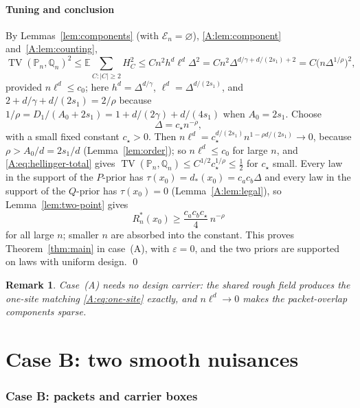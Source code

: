 \documentclass[11pt]{article}
\newtheorem{remark}[remark]{Remark}
\DeclareMathOperator{\TV}{TV}
\newcommand{\E}{\mathbb{E}}
\newcommand{\PP}{\mathbb{P}}
\newcommand{\abs}[1]{\lvert #1\rvert}
\begin{document}
\subsection{Tuning and conclusion}\label{A:sec:tuning}
By Lemmas~\ref{lem:components} (with \(\mathcal E_n=\varnothing\)),
\ref{A:lem:component} and~\ref{A:lem:counting},
\begin{equation}
 \TV(\PP_n,\mathbb Q_n)^2\le\E\sum_{C:\abs C\ge2}H^2_C\le Cn^2h^d\ell^d\Delta^2
 =Cn^2\Delta^{d/\gamma+d/(2s_1)+2}=C\bigl(n\Delta^{1/\rho}\bigr)^2,
 \label{A:eq:hellinger-total}
\end{equation}
provided \(n\ell^d\le c_0\); here \(h^d=\Delta^{d/\gamma}\), \(\ell^d=\Delta^{d/(2s_1)}\),
and \(2+d/\gamma+d/(2s_1)=2/\rho\) because \(1/\rho=D_1/(A_0+2s_1)=1+d/(2\gamma)+d/(4s_1)\)
when \(A_0=2s_1\).  Choose
\begin{equation}
 \Delta=c_{\star}n^{-\rho},
 \label{A:eq:tuning}
\end{equation}
with a small fixed constant \(c_{\star}>0\).  Then
\(n\ell^d=c_{\star}^{d/(2s_1)}n^{1-\rho d/(2s_1)}\to0\), because
\(\rho>A_0/d=2s_1/d\) (Lemma~\ref{lem:order}); so \(n\ell^d\le c_0\) for large
\(n\), and \eqref{A:eq:hellinger-total} gives
\(\TV(\PP_n,\mathbb Q_n)\le C^{1/2}c_{\star}^{1/\rho}\le\frac12\) for \(c_{\star}\)
small.  Every law in the support of the \(P\)-prior has
\(\tau(x_0)=d_*(x_0)=c_ac_b\Delta\) and every law in the support of the
\(Q\)-prior has \(\tau(x_0)=0\) (Lemma~\ref{A:lem:legal}), so
Lemma~\ref{lem:two-point} gives
\[
 R^*_n(x_0)\ge\frac{c_ac_bc_{\star}}{4}\,n^{-\rho}
\]
for all large \(n\); smaller \(n\) are absorbed into the constant.  This
proves Theorem~\ref{thm:main} in case~(A), with \(\varepsilon=0\), and the
two priors are supported on laws with uniform design.  \qed

\begin{remark}
Case~(A) needs no design carrier: the shared rough field produces the
one-site matching \eqref{A:eq:one-site} exactly, and \(n\ell^d\to0\) makes
the packet-overlap components sparse.
\end{remark}


\part{Case B: two smooth nuisances}

\section{Case B: packets and carrier boxes}\label{B:sec:packets}
\end{document}
